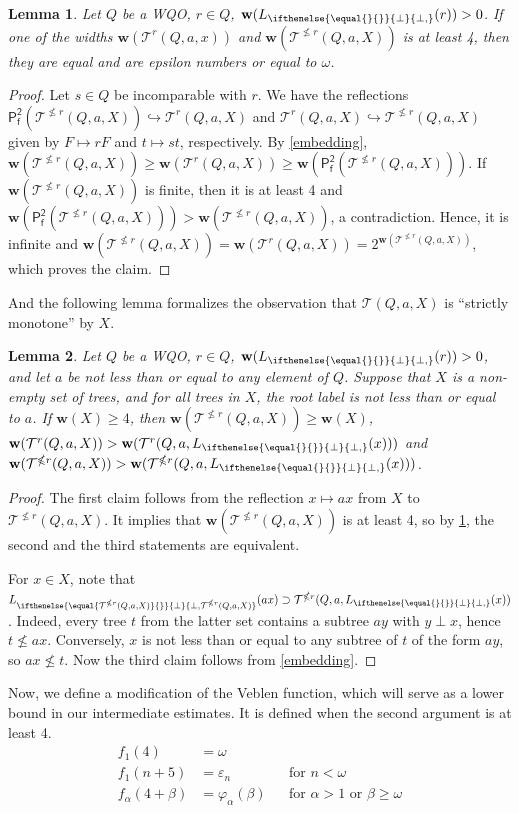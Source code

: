 \documentclass[runningheads]{llncs}
\let \nleq \nleqslant
\let \geq \geqslant
\let \phi \varphi
\let \epsilon \varepsilon
\let \embeds \hookrightarrow
\newcommand \K [2][]{L_{\ifthenelse{\equal{#1}{}}{\bot}{\bot,#1}}(#2)}
\renewcommand \k [2][]{\w(\K[#1]{#2})}
\renewcommand \S [1][]{\mathsf{P_f^{#1}}}
\def \T {\mathcal{T}}
\def \w {\textbf{w}}
\newtheorem{lemma}{Lemma}
\begin{document}
\begin{lemma}\label{w(T) is epsilon}
    Let $Q$ be a WQO, $r \in Q$, $\k{r} > 0$. If one of the widths $\w(\T^r(Q, a, x))$ and $\w(\T^{\nleq r}(Q, a, X))$ is at least 4, then they are equal and are epsilon numbers or equal to $\omega$.
\end{lemma}
\begin{proof}
    Let $s \in Q$ be incomparable with $r$. We have the reflections $\S[2](\T^{\nleq r}(Q, a, X)) \embeds \T^r(Q, a, X)$ and $\T^r(Q, a, X) \embeds \T^{\nleq r}(Q, a, X)$ given by $F \mapsto rF$ and $t \mapsto st$, respectively. By \cref{embedding}, $\w(\T^{\nleq r}(Q, a, X)) \geq \w(\T^r(Q, a, X)) \geq \w(\S[2](\T^{\nleq r}(Q, a, X)))$. If $\w(\T^{\nleq r}(Q, a, X))$ is finite, then it is at least 4 and $\w(\S[2](\T^{\nleq r}(Q, a, X))) > \w(\T^{\nleq r}(Q, a, X))$, a contradiction. Hence, it is infinite and $\w(\T^{\nleq r}(Q, a, X)) = \w(\T^r(Q, a, X)) =2^{\w(\T^{\nleq r}(Q, a, X))}$, which proves the claim.
\end{proof}

And the following lemma formalizes the observation that $\T(Q, a, X)$ is ``strictly monotone'' by $X$.

\begin{lemma}\label{w(T) is monotone by X}
    Let $Q$ be a WQO, $r \in Q$, $\k{r} > 0$, and let $a$ be not less than or equal to any element of $Q$.
    Suppose that $X$ is a non-empty set of trees, and for all trees in $X$, the root label is not less than or equal to $a$.
    If $\w(X) \geq 4$, then $\w(\T^{\nleq r}(Q, a, X)) \geq \w(X)$, $\w(\T^r(Q, a, X)) > \w(\T^r(Q, a, \K{x}))$ and $\w(\T^{\nleq r}(Q, a, X)) > \w(\T^{\nleq r}(Q, a, \K{x}))$.
\end{lemma}
\begin{proof}
    The first claim follows from the reflection $x \mapsto ax$ from $X$ to $\T^{\nleq r}(Q, a, X)$.
    It implies that $\w(\T^{\nleq r}(Q, a, X))$ is at least 4, so by \cref{w(T) is epsilon}, the second and the third statements are equivalent.
    
    For $x \in X$, note that $\K[\T^{\nleq r}(Q, a, X)]{a x} \supset \T^{\nleq r}(Q, a, \K{x})$. Indeed, every tree $t$ from the latter set contains a subtree $a y$ with $y \perp x$, hence $t \nleq a x$. Conversely, $x$ is not less than or equal to any subtree of $t$ of the form $a y$, so $a x \nleq t$. Now the third claim follows from \cref{embedding}.
\end{proof}

Now, we define a modification of the Veblen function, which will serve as a lower bound in our intermediate estimates. It is defined when the second argument is at least 4.
\begin{align*}
    f_1(4) &= \omega\\
    f_1(n+5) &= \epsilon_n &&\text{for } n < \omega\\
    f_\alpha(4+\beta) &= \phi_\alpha(\beta) &&\text{for } \alpha > 1 \text{ or } \beta \geq \omega
\end{align*}
\end{document}
